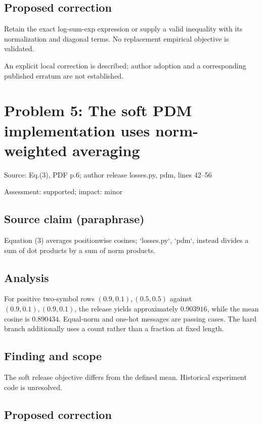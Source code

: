 \documentclass[11pt]{article}
\begin{document}
\subsection*{Proposed correction}

Retain the exact log-sum-exp expression or supply a valid inequality with its normalization and diagonal terms. No replacement empirical objective is validated.

An explicit local correction is described; author adoption and a corresponding published erratum are not established.

\section*{Problem 5: The soft PDM implementation uses norm-weighted averaging}

Source: Eq.(3), PDF p.6; author release losses.py, pdm, lines 42–56

Assessment: supported; impact: minor

\subsection*{Source claim (paraphrase)}

Equation (3) averages positionwise cosines; `losses.py`, `pdm`, instead divides a sum of dot products by a sum of norm products.

\subsection*{Analysis}

For positive two-symbol rows \((0.9,0.1),(0.5,0.5)\) against \((0.9,0.1),(0.9,0.1)\), the release yields approximately \(0.903916\), while the mean cosine is \(0.890434\). Equal-norm and one-hot messages are passing cases. The hard branch additionally uses a count rather than a fraction at fixed length.

\subsection*{Finding and scope}

The soft release objective differs from the defined mean. Historical experiment code is unresolved.

\subsection*{Proposed correction}
\end{document}
